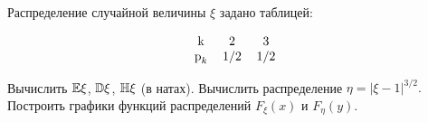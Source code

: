 
\renewcommand*{\proofname}{Решение}

\begin{problem}
Распределение случайной величины $\xi$ задано таблицей:

\[
  \begin{tabular}{ccc}
    k                & 2   & 3   \\
    $\textup{p}_{k}$ & 1/2 & 1/2 \\
  \end{tabular}
\]

Вычислить $\mathbb E\xi$, $\mathbb D\xi$, $\mathbb H\xi$ (в натах). Вычислить распределение $\eta = |\xi-1| ^ {3/2}.$ Построить графики функций распределений $F_\xi(x)$ и $F_\eta(y).$
\end{problem}

